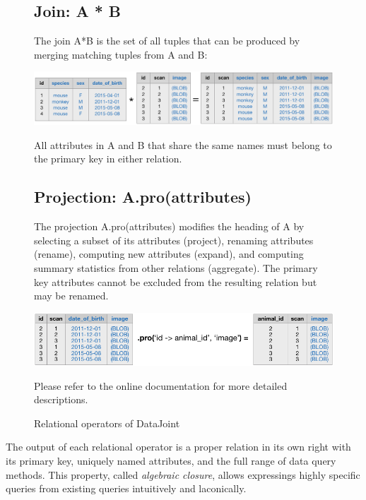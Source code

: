 \documentclass[10pt,letterpaper]{article}
\begin{document}
\begin{figure}
\begin{adjustwidth}{-2.25in}{0in}
\begin{boxedminipage}{\linewidth}
\subsection*{Join: {\sf A * B}}
The join {\sf A*B} is the set of all tuples that can be produced by merging matching tuples from {\sf A} and {\sf B}:

\begin{center}
\includegraphics{./figures/join.pdf}
\end{center}
All attributes in {\sf A} and {\sf B} that share the same names must belong to the primary key in either relation.

\subsection*{Projection: {\sf A.pro(attributes)}}
The projection {\sf A.pro(attributes)} modifies the heading of {\sf A} by selecting a subset of its attributes (project), renaming attributes (rename), computing new attributes (expand), and computing summary statistics from other relations (aggregate).
The primary key attributes cannot be excluded from the resulting relation but may be renamed. 

\begin{center}
\includegraphics{./figures/project.pdf}
\end{center}

Please refer to the online documentation for more detailed descriptions.
\end{boxedminipage}
\caption{Relational operators of DataJoint}
\label{algebra}
\end{adjustwidth}
\end{figure}

The output of each relational operator is a proper relation in its own right with its primary key, uniquely named attributes, and the full range of data query methods.
This property, called \emph{algebraic closure}, allows expressings highly specific queries from existing queries intuitively and laconically.
\end{document}
